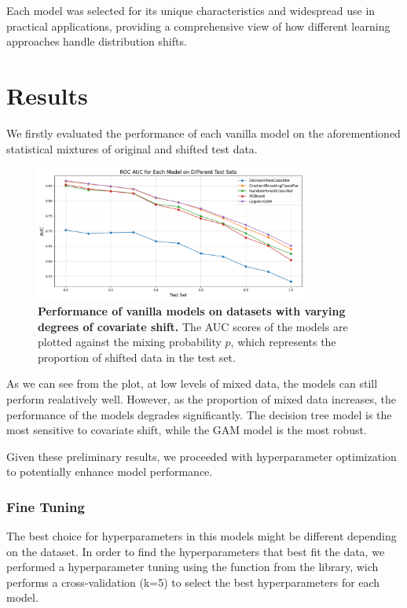 Each model was selected for its unique characteristics and widespread use in practical applications, providing a comprehensive view of how different learning approaches handle distribution shifts.

\section{Results}

We firstly evaluated the performance of each vanilla model on the aforementioned statistical mixtures of original and shifted test data. 

\begin{figure}[H]
    \centering
    \includegraphics[width=0.8\textwidth]{assets/vanilla.png} 
    \caption{\textbf{Performance of vanilla models on datasets with varying degrees of covariate shift.} \newline The AUC scores of the models are plotted against the mixing probability $p$, which represents the proportion of shifted data in the test set.}
    \label{fig:vanilla-models-perf}
\end{figure}

As we can see from the plot, at low levels of mixed data, the models can still perform realatively well. However, as the proportion of mixed data increases, the performance of the models degrades significantly. The decision tree model is the most sensitive to covariate shift, while the GAM model is the most robust.

Given these preliminary results, we proceeded with hyperparameter optimization to potentially enhance model performance.

\subsubsection{Fine Tuning}

The best choice for hyperparameters in this models might be different depending on the dataset. In order to find the hyperparameters that best fit the data, we performed a hyperparameter tuning using the  function from the  library, wich performs a cross-validation (k=5) to select the best hyperparameters for each model.

